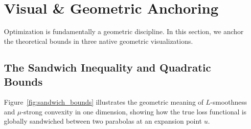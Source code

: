 \section{Visual \& Geometric Anchoring}

Optimization is fundamentally a geometric discipline. In this section, we anchor the theoretical bounds in three native geometric visualizations.

\subsection{The Sandwich Inequality and Quadratic Bounds}
Figure~\ref{fig:sandwich_bounds} illustrates the geometric meaning of $L$-smoothness and $\mu$-strong convexity in one dimension, showing how the true loss functional is globally sandwiched between two parabolas at an expansion point $u$.

